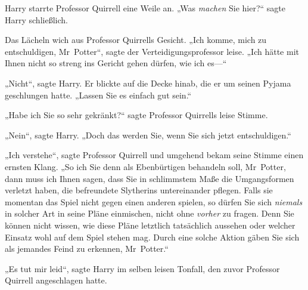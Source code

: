 Harry starrte Professor Quirrell eine Weile an. „Was \emph{machen} Sie hier?“ sagte Harry schließlich.

Das Lächeln wich aus Professor Quirrells Gesicht. „Ich komme, mich zu entschuldigen, Mr~Potter“, sagte der Verteidigungsprofessor leise. „Ich hätte mit Ihnen nicht so streng ins Gericht gehen dürfen, wie ich es—“

„Nicht“, sagte Harry. Er blickte auf die Decke hinab, die er um seinen Pyjama geschlungen hatte. „Lassen Sie es einfach gut sein.“

„Habe ich Sie so sehr gekränkt?“ sagte Professor Quirrells leise Stimme.

„Nein“, sagte Harry. „Doch das werden Sie, wenn Sie sich jetzt entschuldigen.“

„Ich verstehe“, sagte Professor Quirrell und umgehend bekam seine Stimme einen ernsten Klang. „So ich Sie denn als Ebenbürtigen behandeln soll, Mr~Potter, dann muss ich Ihnen sagen, dass Sie in schlimmstem Maße die Umgangsformen verletzt haben, die befreundete Slytherins untereinander pflegen. Falls sie momentan das Spiel nicht gegen einen anderen spielen, so dürfen Sie sich \emph{niemals} in solcher Art in seine Pläne einmischen, nicht ohne \emph{vorher} zu fragen. Denn Sie können nicht wissen, wie diese Pläne letztlich tatsächlich aussehen oder welcher Einsatz wohl auf dem Spiel stehen mag. Durch eine solche Aktion gäben Sie sich als jemandes Feind zu erkennen, Mr~Potter.“

„Es tut mir leid“, sagte Harry im selben leisen Tonfall, den zuvor Professor Quirrell angeschlagen hatte.


